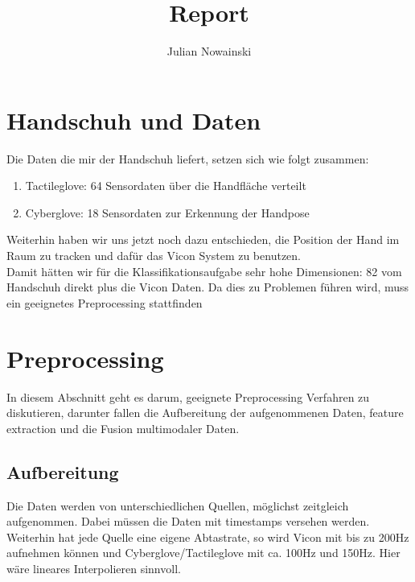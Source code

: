 \documentclass[]{report}
\title{Report}
\author{Julian Nowainski}
\begin{document}
\maketitle

\section*{Handschuh und Daten}
Die Daten die mir der Handschuh liefert, setzen sich wie folgt zusammen:
\begin{enumerate}
\item Tactileglove: 64 Sensordaten über die Handfläche verteilt
\item Cyberglove: 18 Sensordaten zur Erkennung der Handpose
\end{enumerate}
Weiterhin haben wir uns jetzt noch dazu entschieden, die Position der Hand im Raum zu tracken und dafür das Vicon System zu benutzen. \\
Damit hätten wir für die Klassifikationsaufgabe sehr hohe Dimensionen: 82 vom Handschuh direkt plus die Vicon Daten. Da dies zu Problemen führen wird, muss ein geeignetes Preprocessing stattfinden

\section*{Preprocessing}
In diesem Abschnitt geht es darum, geeignete Preprocessing Verfahren zu diskutieren, darunter fallen die Aufbereitung der aufgenommenen Daten, feature extraction und die Fusion multimodaler Daten.

\subsection*{Aufbereitung}
Die Daten werden von unterschiedlichen Quellen, möglichst zeitgleich aufgenommen. Dabei müssen die Daten mit timestamps versehen werden. Weiterhin hat jede Quelle eine eigene Abtastrate, so wird Vicon mit bis zu 200Hz aufnehmen können und Cyberglove/Tactileglove mit ca. 100Hz und 150Hz. Hier wäre lineares Interpolieren sinnvoll.
\end{document}

